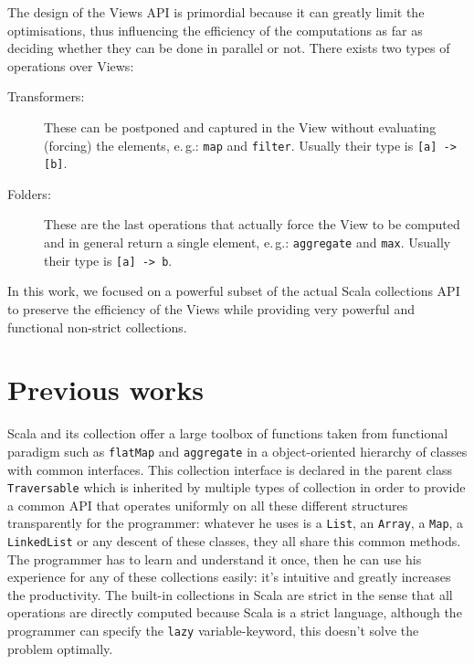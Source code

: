\documentclass[a4paper,12pt,twocolumn]{article}
\begin{document}
The design of the Views API is primordial because it can greatly limit the optimisations, thus influencing the efficiency of the computations as far as deciding whether they can be done in parallel or not.
There exists two types of operations over Views:
\begin{description}
    \item[Transformers:] These can be postponed and captured in the View without evaluating (forcing) the elements, e.\,g.: \verb|map| and \verb|filter|. Usually their type is \verb|[a] -> [b]|.
    \item[Folders:] These are the last operations that actually force the View to be computed and in general return a single element, e.\,g.: \verb|aggregate| and \verb|max|. Usually their type is \verb|[a] -> b|.
\end{description}
In this work, we focused on a powerful subset of the actual Scala collections API to preserve the efficiency of the Views while providing very powerful and functional non-strict collections.

\section{Previous works}
Scala and its collection offer a large toolbox of functions taken from functional paradigm such as \verb|flatMap| and \verb|aggregate| in a object-oriented hierarchy of classes with common interfaces.
This collection interface is declared in the parent class \verb|Traversable|\cite{scala-collections} which is inherited by multiple types of collection in order to provide a common API that operates uniformly on all these different structures transparently for the programmer: whatever he uses is a \verb|List|, an \verb|Array|, a \verb|Map|, a \verb|LinkedList| or any descent of these classes, they all share this common methods.
The programmer has to learn and understand it once, then he can use his experience for any of these collections easily: it's intuitive and greatly increases the productivity.
The built-in collections in Scala are strict in the sense that all operations are directly computed because Scala is a strict language, although the programmer can specify the \verb|lazy| variable-keyword, this doesn't solve the problem optimally.
\end{document}
